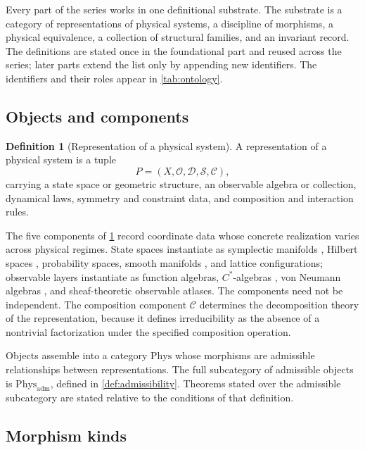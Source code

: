 \documentclass[11pt,letterpaper]{article}
\theoremstyle{definition}
\newtheorem{definition}[definition]{Definition}
\theoremstyle{remark}
\begin{document}
Every part of the series works in one definitional substrate. The substrate is a category of representations of physical systems, a discipline of morphisms, a physical equivalence, a collection of structural families, and an invariant record. The definitions are stated once in the foundational part and reused across the series; later parts extend the list only by appending new identifiers. The identifiers and their roles appear in \cref{tab:ontology}.

\subsection{Objects and components}

\begin{definition}[Representation of a physical system]
\label{def:representation}
A representation of a physical system is a tuple
\[
  P = (X, \mathcal{O}, \mathcal{D}, \mathcal{S}, \mathcal{C}),
\]
carrying a state space or geometric structure, an observable algebra or collection, dynamical laws, symmetry and constraint data, and composition and interaction rules.
\end{definition}

The five components of \cref{def:representation} record coordinate data whose concrete realization varies across physical regimes. State spaces instantiate as symplectic manifolds \cite{corpus-6,corpus-68}, Hilbert spaces \cite{corpus-9}, probability spaces, smooth manifolds \cite{corpus-50,corpus-51}, and lattice configurations; observable layers instantiate as function algebras, $C^*$-algebras \cite{corpus-9}, von Neumann algebras \cite{corpus-8}, and sheaf-theoretic observable atlases. The components need not be independent. The composition component $\mathcal{C}$ determines the decomposition theory of the representation, because it defines irreducibility as the absence of a nontrivial factorization under the specified composition operation.

Objects assemble into a category $\mathrm{Phys}$ whose morphisms are admissible relationships between representations. The full subcategory of admissible objects is $\mathrm{Phys}_{\mathrm{adm}}$, defined in \cref{def:admissibility}. Theorems stated over the admissible subcategory are stated relative to the conditions of that definition.

\subsection{Morphism kinds}
\label{sec:morphisms}
\end{document}
